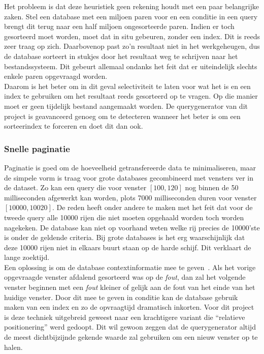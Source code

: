 Het probleem is dat deze heuristiek geen rekening houdt met een paar belangrijke zaken. Stel een database met een miljoen paren voor en een conditie in een query brengt dit terug naar een half miljoen ongesorteerde paren. Indien er toch gesorteerd moet worden, moet dat in situ gebeuren, zonder een index. Dit is reeds zeer traag op zich. Daarbovenop past zo'n resultaat niet in het werkgeheugen, dus de database sorteert in stukjes door het resultaat weg te schrijven naar het bestandssysteem. Dit gebeurt allemaal ondanks het feit dat er uiteindelijk slechts enkele paren opgevraagd worden.\\

Daarom is het beter om in dit geval selectiviteit te laten voor wat het is en een index te gebruiken om het resultaat reeds gesorteerd op te vragen. Op die manier moet er geen tijdelijk bestand aangemaakt worden. De querygenerator van dit project is geavanceerd genoeg om te detecteren wanneer het beter is om een sorteerindex te forceren en doet dit dan ook.

\subsubsection{Snelle paginatie}
Paginatie is goed om de hoeveelheid getransfereerde data te minimaliseren, maar de simpele vorm is traag voor grote databases gecombineerd met vensters ver in de dataset. Zo kan een query die voor venster $[100, 120]$ nog binnen de 50 milliseconden afgewerkt kan worden, plots 7000 milliseconden duren voor venster $[10000, 10020]$. De reden heeft onder andere te maken met het feit dat voor de tweede query alle 10000 rijen die niet moeten opgehaald worden toch worden nagekeken. De database kan niet op voorhand weten welke rij precies de 10000'ste is onder de geldende criteria. Bij grote databases is het erg waarschijnlijk dat deze 10000 rijen niet in elkaars buurt staan op de harde schijf. Dit verklaart de lange zoektijd.\\

Een oplossing is om de database contextinformatie mee te geven~\cite{sqlfastpag}. Als het vorige opgevraagde venster afdalend gesorteerd was op de \emph{fout}, dan zal het volgende venster beginnen met een \emph{fout} kleiner of gelijk aan de fout van het einde van het huidige venster. Door dit mee te geven in conditie kan de database gebruik maken van een index en zo de opvraagtijd dramatisch inkorten. Voor dit project is deze techniek uitgebreid geweest naar een krachtigere variant die ``relatieve positionering'' werd gedoopt. Dit wil gewoon zeggen dat de querygenerator altijd de meest dichtbijzijnde gekende waarde zal gebruiken om een nieuw venster op te halen.

